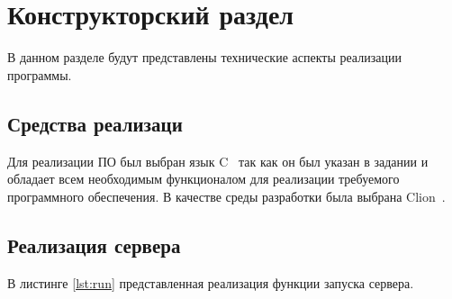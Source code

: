 \chapter{Конструкторский раздел}

В данном разделе будут представлены технические аспекты реализации программы.

\section{Средства реализаци}

Для реализации ПО был выбран язык C~\cite{clang} так как он был указан в задании и обладает всем необходимым функционалом для реализации требуемого программного обеспечения. В качестве среды разработки была выбрана Clion~\cite{clion}.

\section{Реализация сервера}

В листинге \ref{lst:run} представленная реализация функции запуска сервера.

